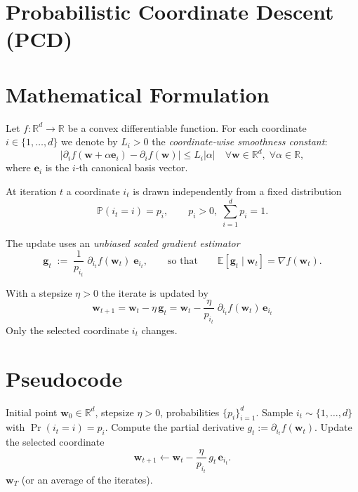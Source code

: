 \documentclass{article}
\newcommand{\E}{\mathbb{E}}
\newcommand{\R}{\mathbb{R}}
\newcommand{\e}{\mathbf{e}}
\begin{document}
\section*{Probabilistic Coordinate Descent (PCD)}

\section*{Mathematical Formulation}
Let $f:\R^{d}\rightarrow\R$ be a convex differentiable function.  
For each coordinate $i\in\{1,\dots,d\}$ we denote by $L_i>0$ the \emph{coordinate‑wise smoothness constant}:
\begin{equation}
\label{eq:smooth}
\bigl|\partial_i f(\mathbf w+\alpha \e_i)-\partial_i f(\mathbf w)\bigr|\le L_i |\alpha|\quad\forall \mathbf w\in\R^{d},\;\forall\alpha\in\R,
\end{equation}
where $\e_i$ is the $i$‑th canonical basis vector.

At iteration $t$ a coordinate $i_t$ is drawn independently from a fixed distribution
\[
\mathbb{P}(i_t=i)=p_i,\qquad p_i>0,\;\sum_{i=1}^{d}p_i=1 .
\]

The update uses an \emph{unbiased scaled gradient estimator}
\[
\mathbf g_t\;:=\;\frac{1}{p_{i_t}}\; \partial_{i_t}f(\mathbf w_t)\;\e_{i_t},
\qquad\text{so that}\qquad 
\E[\mathbf g_t\mid\mathbf w_t]=\nabla f(\mathbf w_t).
\]

With a stepsize $\eta>0$ the iterate is updated by
\begin{equation}
\label{eq:update}
\boxed{\;\mathbf w_{t+1}= \mathbf w_t-\eta\,\mathbf g_t
      =\mathbf w_t-\frac{\eta}{p_{i_t}}\;\partial_{i_t}f(\mathbf w_t)\,\e_{i_t}\;}
\end{equation}
Only the selected coordinate $i_t$ changes.

\section*{Pseudocode}
\begin{algorithm}[H]
\caption{Probabilistic Coordinate Descent}
\begin{algorithmic}[1]
\Require Initial point $\mathbf w_0\in\R^{d}$, stepsize $\eta>0$, probabilities $\{p_i\}_{i=1}^{d}$.
    \State Sample $i_t\sim\{1,\dots,d\}$ with $\Pr(i_t=i)=p_i$.
    \State Compute the partial derivative $g_{t}:=\partial_{i_t}f(\mathbf w_t)$.
    \State Update the selected coordinate
    \[
        \mathbf w_{t+1}\gets\mathbf w_t-\frac{\eta}{p_{i_t}}\,g_{t}\,\e_{i_t}.
    \]
\EndFor
\State \Return $\mathbf w_T$ (or an average of the iterates).
\end{algorithmic}
\end{algorithm}
\end{document}
